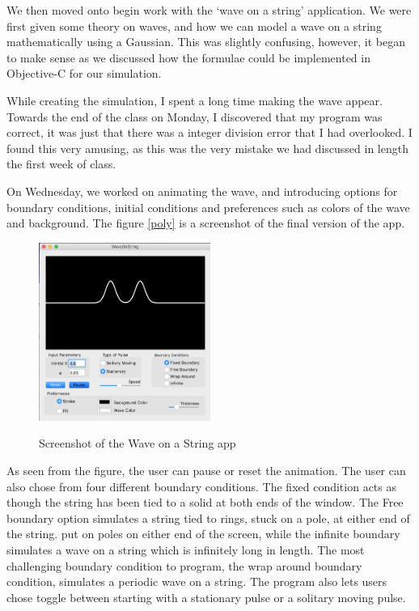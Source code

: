 \documentclass{article}
\begin{document}
 
 
 We then moved onto begin work with the `wave on a string' application. We were first given some theory on waves, and how we can model a wave on a string mathematically using a Gaussian. This was slightly confusing, however, it began to make sense as we discussed how the formulae could be implemented in Objective-C for our simulation.  
 
 While creating the simulation, I spent a long time making the wave appear. Towards the end of the class on Monday, I discovered that my program was correct, it was just that there was a integer division error that I had overlooked. I found this very amusing, as this was the very mistake we had discussed in length the first week of class.
 
 On Wednesday, we worked on animating the wave, and introducing options for boundary conditions, initial conditions and preferences such as colors of the wave and background. The figure \ref{poly} is a screenshot of the final version of the app. 
 
 
 
 \begin{figure}[h]
 	\caption{Screenshot of the Wave on a String app}
 	\centering
 	\includegraphics[width=0.5\textwidth]{wave} \label{wave}
 \end{figure}
 
 As seen from the figure, the user can pause or reset the animation. The user can also chose from four different boundary conditions. The fixed condition acts as though the string has been tied to a solid at both ends of the window. The Free boundary option simulates a string tied to rings, stuck on a pole, at either end of the string. put on poles on either end of the screen, while the infinite boundary simulates a wave on a string which is infinitely long in length. The most challenging boundary condition to program, the wrap around boundary condition, simulates a periodic wave on a string. The program also lets users chose toggle between starting with a stationary pulse or a solitary moving pulse. 
 
\end{document}
